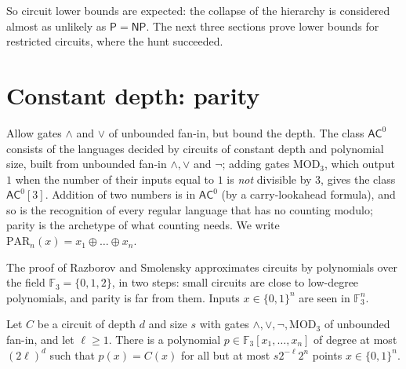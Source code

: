 So circuit lower bounds are expected: the collapse of the hierarchy is considered almost as unlikely as $\mathsf P=\mathsf{NP}$. The next three sections prove lower bounds for restricted circuits, where the hunt succeeded.

\section{Constant depth: parity}\label{sec:parity}

Allow gates $\land$ and $\lor$ of unbounded fan-in, but bound the depth. The class $\mathsf{AC}^0$ consists of the languages decided by circuits of constant depth and polynomial size, built from unbounded fan-in $\land,\lor$ and $\lnot$; adding gates $\mathrm{MOD}_3$, which output $1$ when the number of their inputs equal to $1$ is \emph{not} divisible by $3$, gives the class $\mathsf{AC}^0[3]$. Addition of two numbers is in $\mathsf{AC}^0$ (by a carry-lookahead formula), and so is the recognition of every regular language that has no counting modulo; parity is the archetype of what counting needs. We write $\mathrm{PAR}_n(x)=x_1\oplus\dots\oplus x_n$.

The proof of Razborov and Smolensky approximates circuits by polynomials over the field $\mathbb F_3=\{0,1,2\}$, in two steps: small circuits are close to low-degree polynomials, and parity is far from them. Inputs $x\in\{0,1\}^n$ are seen in $\mathbb F_3^n$.

\begin{lemma}\label{lem:approxpoly}
Let $C$ be a circuit of depth $d$ and size $s$ with gates $\land,\lor,\lnot,\mathrm{MOD}_3$ of unbounded fan-in, and let $\ell\ge1$. There is a polynomial $p\in\mathbb F_3[x_1,\dots,x_n]$ of degree at most $(2\ell)^d$ such that $p(x)=C(x)$ for all but at most $s2^{-\ell}2^n$ points $x\in\{0,1\}^n$.
\end{lemma}

